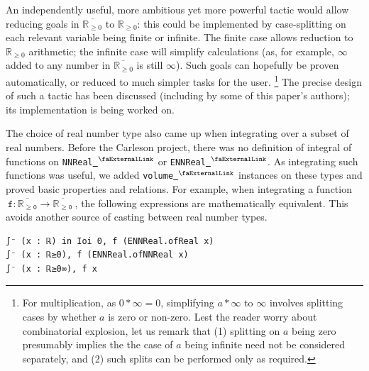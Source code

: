 \documentclass[12pt]{amsart}
\newcounter{lstlisting}[section]
\newcommand{\lean}[1]{\lstinline{#1}}
\newcommand{\mlean}[1]{\mathtt{\ #1\ }}
\newcommand*{\real}{\mathbb{R}} %
\newcommand{\nnreal}{\real_{\ge0}}
\newcommand{\ennreal}{\overline{\real_{\ge0}}}
\newcommand{\extlink}{~\ensuremath{{}^\text{\faExternalLink}}}
\theoremstyle{definition}
\theoremstyle{plain}
\begin{document}
An independently useful, more ambitious yet more powerful tactic would allow reducing goals in $\ennreal$ to $\nnreal$: this could be implemented by case-splitting on each relevant variable being finite or infinite. The finite case allows reduction to $\nnreal$ arithmetic; the infinite case will simplify calculations (as, for example, $\infty$ added to any number in $\ennreal$ is still $\infty$). Such goals can hopefully be proven automatically, or reduced to much simpler tasks for the user.%
\footnote{For multiplication, as $0 * \infty = 0$, simplifying $a*\infty$ to $\infty$ involves splitting cases by whether $a$ is zero or non-zero. Lest the reader worry about combinatorial explosion, let us remark that (1) splitting on $a$ being zero presumably implies the the case of $a$ being infinite need not be considered separately, and (2) such splits can be performed only as required.}
The precise design of such a tactic has been discussed (including by some of this paper's authors); its implementation is being worked on.

The choice of real number type also came up when integrating over a subset of real numbers. Before the Carleson project, there was no definition of integral of functions on \lean{NNReal}\href{https://github.com/leanprover-community/mathlib4/blob/81a5d257c8e410db227a6665ed08f64fea08e997/Mathlib/Data/NNReal/Defs.lean#L58}{\extlink} or \lean{ENNReal}\href{https://github.com/leanprover-community/mathlib4/blob/81a5d257c8e410db227a6665ed08f64fea08e997/Mathlib/Data/ENNReal/Basic.lean#L101}{\extlink}. As integrating such functions was useful, we added \lean{volume}\href{https://github.com/leanprover-community/mathlib4/blob/81a5d257c8e410db227a6665ed08f64fea08e997/Mathlib/MeasureTheory/Measure/MeasureSpaceDef.lean#L355}{\extlink} instances on these types and proved basic properties and relations. For example, when integrating a function $\mlean{f : \ennreal\to \ennreal}$, the following expressions are mathematically equivalent. This avoids another source of casting between real number types.
\begin{lstlisting}[mathescape]
∫⁻ (x : ℝ) in Ioi 0, f (ENNReal.ofReal x)
∫⁻ (x : ℝ≥0), f (ENNReal.ofNNReal x)
∫⁻ (x : ℝ≥0∞), f x
\end{lstlisting}
\end{document}
